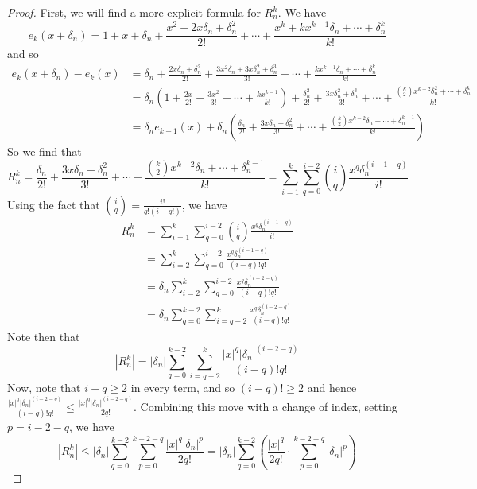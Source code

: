 \begin{proof}
    First, we will find a more explicit formula for $R_n^k$. We have
    \[e_k(x + \delta_n) = 1 + x + \delta_n + \frac{x^2 + 2x\delta_n + \delta_n^2}{2!} + \cdots + \frac{x^k + kx^{k-1}\delta_n + \cdots + \delta_n^k}{k!} \]
    and so
    \begin{align*}
    e_k(x + \delta_n) - e_k(x) &= \delta_n + \frac{2x\delta_n + \delta_n^2}{2!} + \frac{3x^2\delta_n + 3x\delta_n^2 + \delta_n^3}{3!} + \cdots + \frac{kx^{k-1}\delta_n + \cdots + \delta_n^k}{k!} \\
        &= \delta_n\left(1 + \frac{2x}{2!} + \frac{3x^2}{3!} + \cdots + \frac{kx^{k-1}}{k!}\right) + \frac{\delta_n^2}{2!} + \frac{3x\delta_n^2 + \delta_n^3}{3!} + \cdots + \frac{\binom{k}{2} x^{k-2}\delta_n^2 + \cdots + \delta_n^k}{k!} \\
        &= \delta_n e_{k-1}(x) + \delta_n\left(\frac{\delta_n}{2!} + \frac{3x\delta_n + \delta_n^2}{3!} + \cdots + \frac{\binom{k}{2} x^{k-2}\delta_n + \cdots + \delta_n^{k-1}}{k!}\right)
    \end{align*}
    So we find that 
    \[R_n^k = \frac{\delta_n}{2!} + \frac{3x\delta_n + \delta_n^2}{3!} + \cdots + \frac{\binom{k}{2} x^{k-2}\delta_n + \cdots + \delta_n^{k-1}}{k!} = \sum_{i=1}^k \sum_{q=0}^{i-2} \binom{i}{q} \frac{x^q \delta_n^{(i-1-q)}}{i!}\]
    Using the fact that $\binom{i}{q} = \frac{i!}{q!(i-q!)}$, we have
    \begin{align*}
    R_n^k &= \sum_{i=1}^k \sum_{q=0}^{i-2} \binom{i}{q} \frac{x^q \delta_n^{(i-1-q)}}{i!} \\
        &= \sum_{i=2}^k \sum_{q=0}^{i-2}\frac{x^q\delta_n^{(i-1-q)}}{(i-q)!q!} \\
        &= \delta_n \sum_{i=2}^k \sum_{q=0}^{i-2} \frac{x^{q}\delta_n^{(i-2-q)}}{(i-q)!q!} \\
        &= \delta_n \sum_{q=0}^{k-2}\sum_{i=q+2}^k \frac{x^{q}\delta_n^{(i-2-q)}}{(i-q)!q!}
    \end{align*}
    Note then that
    \[ |R_n^k| = |\delta_n| \sum_{q=0}^{k-2}\sum_{i=q+2}^k \frac{|x|^q |\delta_n|^{(i-2-q)}}{(i-q)!q!} \]
    Now, note that $i - q \geq 2$ in every term, and so $(i-q)! \geq 2$ and hence $\frac{|x|^q |\delta_n|^{(i-2-q)}}{(i-q)!q!} \leq \frac{|x|^q |\delta_n|^{(i-2-q)}}{2q!}$. Combining this move with a change of index, setting $p = i - 2 - q$, we have
    \[ |R_n^k| \leq |\delta_n|\sum_{q=0}^{k-2} \sum_{p=0}^{k-2-q} \frac{|x|^q |\delta_n|^p}{2q!} = |\delta_n| \sum_{q=0}^{k-2} \left(\frac{|x|^q}{2q!} \cdot \sum_{p=0}^{k-2-q} |\delta_n|^p \right) \]

\end{proof}
